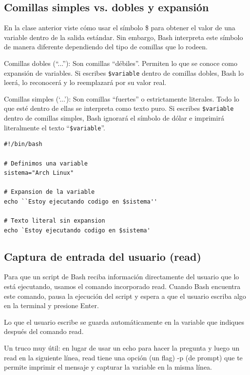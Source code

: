 \newpage

\subsection{Comillas simples vs. dobles y expansión}

En la clase anterior viste cómo usar el símbolo \$ para obtener el valor de una variable dentro de la salida estándar. Sin embargo, Bash interpreta este símbolo de manera diferente dependiendo del tipo de comillas que lo rodeen.

Comillas dobles (``...''): Son comillas ``débiles''. Permiten lo que se conoce como expansión de variables. Si escribes \lstinline!$variable! dentro de comillas dobles, Bash lo leerá, lo reconocerá y lo reemplazará por su valor real.

Comillas simples (`...'): Son comillas ``fuertes'' o estrictamente literales. Todo lo que esté dentro de ellas se interpreta como texto puro. Si escribes \lstinline!$variable! dentro de comillas simples, Bash ignorará el símbolo de dólar e imprimirá literalmente el texto ``\lstinline!$variable!''.

\begin{ejemplo}
\begin{lstlisting}
#!/bin/bash

# Definimos una variable
sistema="Arch Linux"

# Expansion de la variable
echo ``Estoy ejecutando codigo en $sistema''

# Texto literal sin expansion
echo `Estoy ejecutando codigo en $sistema'
\end{lstlisting}
\end{ejemplo}

\newpage

\subsection{Captura de entrada del usuario (read)}

Para que un script de Bash reciba información directamente del usuario que lo está ejecutando, usamos el comando incorporado read. Cuando Bash encuentra este comando, pausa la ejecución del script y espera a que el usuario escriba algo en la terminal y presione Enter.

Lo que el usuario escribe se guarda automáticamente en la variable que indiques después del comando read.

Un truco muy útil: en lugar de usar un echo para hacer la pregunta y luego un read en la siguiente línea, read tiene una opción (un flag) -p (de prompt) que te permite imprimir el mensaje y capturar la variable en la misma línea.

